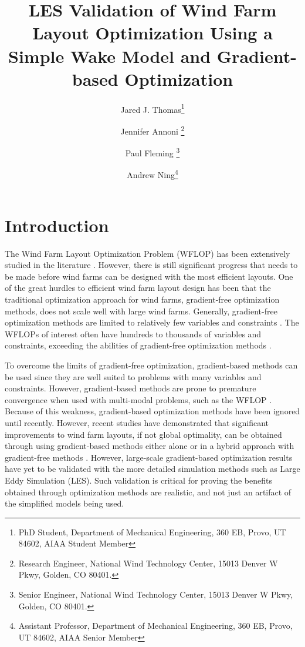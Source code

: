 \documentclass[conf]{new-aiaa}
\title{LES Validation of Wind Farm Layout Optimization Using a Simple Wake Model and Gradient-based Optimization}
\author{Jared J. Thomas\footnote{PhD Student, Department of Mechanical Engineering, 360 EB, Provo, UT 84602, AIAA Student Member}}
\affil{Brigham Young University, Provo, UT 84602}
\author{Jennifer Annoni \footnote{Research Engineer, National Wind Technology Center, 15013 Denver W Pkwy, Golden, CO 80401.}}
\author{Paul Fleming \footnote{Senior Engineer, National Wind Technology Center, 15013 Denver W Pkwy, Golden, CO 80401.}}
\affil{National Renewable Energy Laboratory, Golden, CO, 80401, USA}
\author{Andrew Ning\footnote{Assistant Professor, Department of Mechanical Engineering, 360 EB, Provo, UT 84602, AIAA Senior Member}}
\affil{Brigham Young University, Provo, UT 84602}
\begin{document}
\maketitle



\section{Introduction}
The Wind Farm Layout Optimization Problem (WFLOP) has been extensively studied in the literature \cite{samorani2013,lackner2007,parada2017,elkinton2008,tingey2015,thomas2015_sustech,valverde2014,fleming2015}. However, there is still significant progress that needs to be made before wind farms can be designed with the most efficient layouts. 
One of the great hurdles to efficient wind farm layout design has been that the traditional optimization approach for wind farms, gradient-free optimization methods, does not scale well with large wind farms. Generally, gradient-free optimization methods are limited to relatively few variables and constraints . The WFLOPs of interest often have hundreds to thousands of variables and constraints, exceeding the abilities of gradient-free optimization methods .

To overcome the limits of gradient-free optimization, gradient-based methods can be used since they are well suited to problems with many variables and constraints. However, gradient-based methods are prone to premature convergence when used with multi-modal problems, such as the WFLOP \cite{acero2014}. Because of this weakness, gradient-based optimization methods have been ignored until recently. However, recent studies have demonstrated that significant improvements to wind farm layouts, if not global optimality, can be obtained through using gradient-based methods either alone \cite{fleming2015, gebraad2017-max-aep, thomas2017} or in a hybrid approach with gradient-free methods \cite{rethore2014}. However, large-scale gradient-based optimization results have yet to be validated with the more detailed simulation methods such as Large Eddy Simulation (LES). Such validation is critical for proving the benefits obtained through optimization methods are realistic, and not just an artifact of the simplified models being used. 
\end{document}
